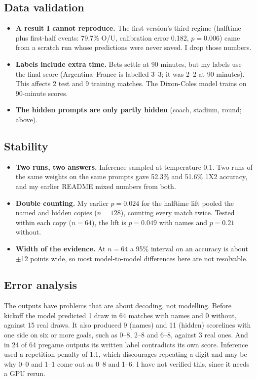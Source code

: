 \documentclass[10pt,letterpaper]{article}
\begin{document}
\subsection{Data validation}

\begin{itemize}
\item \textbf{A result I cannot reproduce.} The first version's third regime (halftime plus
  first-half events: 79.7\% O/U, calibration error 0.182, $p=0.006$) came from a scratch run
  whose predictions were never saved. I drop those numbers.
\item \textbf{Labels include extra time.} Bets settle at 90 minutes, but my labels use the
  final score (Argentina--France is labelled 3--3; it was 2--2 at 90 minutes). This affects
  2 test and 9 training matches. The Dixon-Coles model trains on 90-minute scores.
\item \textbf{The hidden prompts are only partly hidden} (coach, stadium, round; above).
\end{itemize}

\subsection{Stability}

\begin{itemize}
\item \textbf{Two runs, two answers.} Inference sampled at temperature 0.1. Two runs of the
  same weights on the same prompts gave 52.3\% and 51.6\% 1X2 accuracy, and my earlier README
  mixed numbers from both.
\item \textbf{Double counting.} My earlier $p=0.024$ for the halftime lift pooled the named
  and hidden copies ($n=128$), counting every match twice. Tested within each copy ($n=64$),
  the lift is $p=0.049$ with names and $p=0.21$ without.
\item \textbf{Width of the evidence.} At $n=64$ a 95\% interval on an accuracy is about
  $\pm$12 points wide, so most model-to-model differences here are not resolvable.
\end{itemize}

\subsection{Error analysis}

The outputs have problems that are about decoding, not modelling. Before kickoff the model
predicted 1 draw in 64 matches with names and 0 without, against 15 real draws. It also
produced 9 (names) and 11 (hidden) scorelines with one side on six or more goals, such as
0--8, 2--8 and 6--8, against 3 real ones. And in 24 of 64 pregame outputs its written label
contradicts its own score. Inference used a repetition penalty of 1.1, which discourages
repeating a digit and may be why 0--0 and 1--1 come out as 0--8 and 1--6. I have not verified
this, since it needs a GPU rerun.
\end{document}
